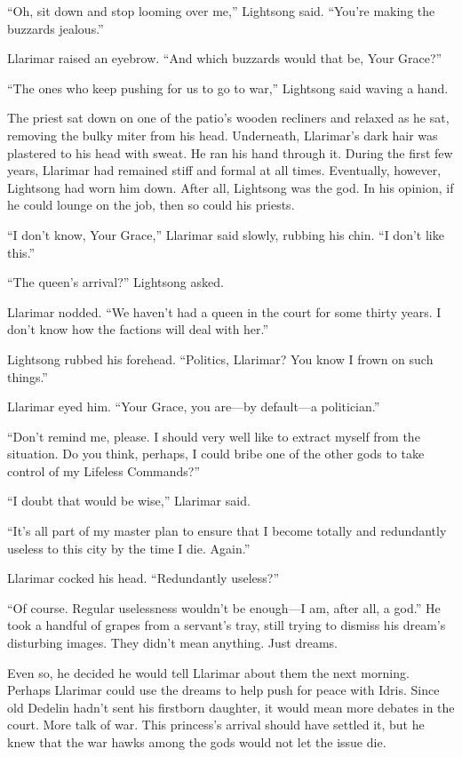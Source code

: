 “Oh, sit down and stop looming over me,” Lightsong said. “You’re making the buzzards jealous.”

Llarimar raised an eyebrow. “And which buzzards would that be, Your Grace?”

“The ones who keep pushing for us to go to war,” Lightsong said waving a hand.

The priest sat down on one of the patio’s wooden recliners and relaxed as he sat, removing the bulky miter from his head. Underneath, Llarimar’s dark hair was plastered to his head with sweat. He ran his hand through it. During the first few years, Llarimar had remained stiff and formal at all times. Eventually, however, Lightsong had worn him down. After all, Lightsong was the god. In his opinion, if he could lounge on the job, then so could his priests.

“I don’t know, Your Grace,” Llarimar said slowly, rubbing his chin. “I don’t like this.”

“The queen’s arrival?” Lightsong asked.

Llarimar nodded. “We haven’t had a queen in the court for some thirty years. I don’t know how the factions will deal with her.”

Lightsong rubbed his forehead. “Politics, Llarimar? You know I frown on such things.”

Llarimar eyed him. “Your Grace, you are—by default—a politician.”

“Don’t remind me, please. I should very well like to extract myself from the situation. Do you think, perhaps, I could bribe one of the other gods to take control of my Lifeless Commands?”

“I doubt that would be wise,” Llarimar said.

“It’s all part of my master plan to ensure that I become totally and redundantly useless to this city by the time I die. Again.”

Llarimar cocked his head. “Redundantly useless?”

“Of course. Regular uselessness wouldn’t be enough—I am, after all, a god.” He took a handful of grapes from a servant’s tray, still trying to dismiss his dream’s disturbing images. They didn’t mean anything. Just dreams.

Even so, he decided he would tell Llarimar about them the next morning. Perhaps Llarimar could use the dreams to help push for peace with Idris. Since old Dedelin hadn’t sent his firstborn daughter, it would mean more debates in the court. More talk of war. This princess’s arrival should have settled it, but he knew that the war hawks among the gods would not let the issue die.

